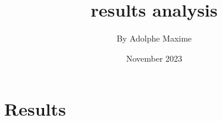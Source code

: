 \documentclass{article}
\title{results analysis}
\author{By Adolphe Maxime}
\date{November 2023}
\begin{document}
\maketitle
\section{Results}
\end{document}
